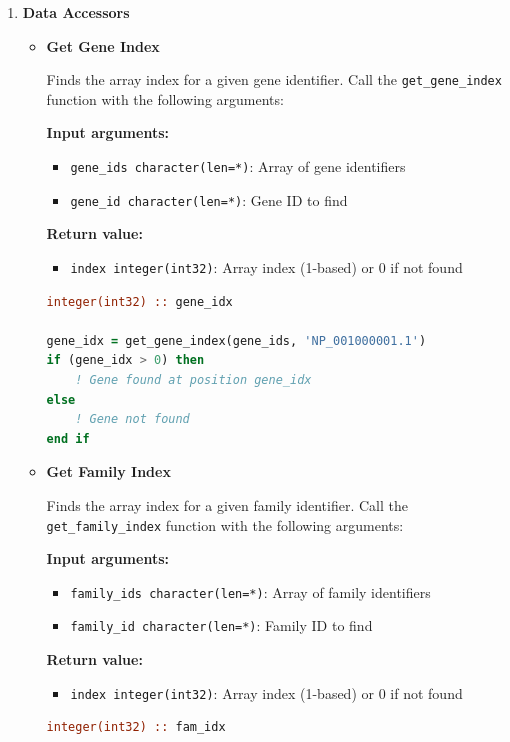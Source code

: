 \begin{enumerate}
    \item \textbf{Data Accessors}
          \begin{itemize}
            \item \textbf{Get Gene Index}
                  
                  Finds the array index for a given gene identifier. Call the \texttt{get\_gene\_index}
                  function with the following arguments:
                  
                  \textbf{Input arguments:}
                  \begin{itemize}
                    \item \texttt{gene\_ids character(len=*)}: Array of gene identifiers
                          
                    \item \texttt{gene\_id character(len=*)}: Gene ID to find
                  \end{itemize}
                  \textbf{Return value:}
                  \begin{itemize}
                    \item \texttt{index integer(int32)}: Array index (1-based) or 0 if not
                          found
                  \end{itemize}
                  \begin{lstlisting}[language=Fortran, caption={Find Gene Index}]
integer(int32) :: gene_idx

gene_idx = get_gene_index(gene_ids, 'NP_001000001.1')
if (gene_idx > 0) then
    ! Gene found at position gene_idx
else
    ! Gene not found
end if
                  \end{lstlisting}
                  
            \item \textbf{Get Family Index}
                  
                  Finds the array index for a given family identifier. Call the \texttt{get\_family\_index}
                  function with the following arguments:
                  
                  \textbf{Input arguments:}
                  \begin{itemize}
                    \item \texttt{family\_ids character(len=*)}: Array of family identifiers
                          
                    \item \texttt{family\_id character(len=*)}: Family ID to find
                  \end{itemize}
                  \textbf{Return value:}
                  \begin{itemize}
                    \item \texttt{index integer(int32)}: Array index (1-based) or 0 if not
                          found
                  \end{itemize}
                  \begin{lstlisting}[language=Fortran, caption={Find Family Index}]
integer(int32) :: fam_idx


\end{lstlisting}
\end{itemize}
\end{enumerate}
